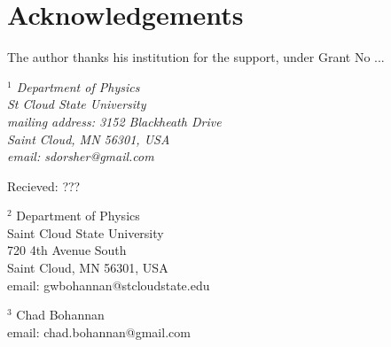 \documentclass[twoside,reqno,11pt]{article}
\begin{document}



\smallskip
\section*{Acknowledgements}

The author thanks his institution for the support, under Grant No
...






\bigskip \smallskip


\it
$^1$ Department of Physics \\
St Cloud State University \\
mailing address: 3152 Blackheath Drive \\
Saint Cloud, MN 56301, USA \\ [4pt]
email: sdorsher@gmail.com

\hfill Recieved: ???

$^2$ Department of Physics\\
Saint Cloud State University\\
720 4th Avenue South\\
Saint Cloud, MN 56301, USA\\ [4pt]
email: gwbohannan@stcloudstate.edu

$^3$ Chad Bohannan \\
email: chad.bohannan@gmail.com
\end{document}
